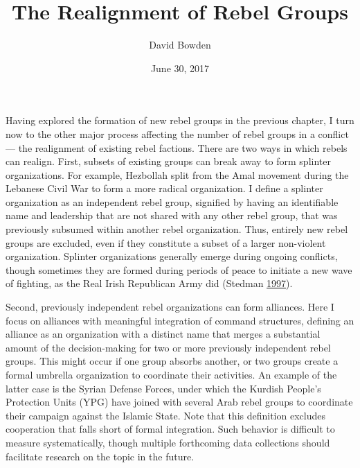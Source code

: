 \documentclass[12pt,]{book}
\title{The Realignment of Rebel Groups}
\author{David Bowden}
\date{June 30, 2017}
\theoremstyle{definition}
\theoremstyle{definition}
\theoremstyle{remark}
\begin{document}
\maketitle

\doublespacing

\mainmatter

Having explored the formation of new rebel groups in the previous
chapter, I turn now to the other major process affecting the number of
rebel groups in a conflict --- the realignment of existing rebel
factions. There are two ways in which rebels can realign. First, subsets
of existing groups can break away to form splinter organizations. For
example, Hezbollah split from the Amal movement during the Lebanese
Civil War to form a more radical organization. I define a splinter
organization as an independent rebel group, signified by having an
identifiable name and leadership that are not shared with any other
rebel group, that was previously subsumed within another rebel
organization. Thus, entirely new rebel groups are excluded, even if they
constitute a subset of a larger non-violent organization. Splinter
organizations generally emerge during ongoing conflicts, though
sometimes they are formed during periods of peace to initiate a new wave
of fighting, as the Real Irish Republican Army did (Stedman
\protect\hyperlink{ref-Stedman1997}{1997}).

Second, previously independent rebel organizations can form alliances.
Here I focus on alliances with meaningful integration of command
structures, defining an alliance as an organization with a distinct name
that merges a substantial amount of the decision-making for two or more
previously independent rebel groups. This might occur if one group
absorbs another, or two groups create a formal umbrella organization to
coordinate their activities. An example of the latter case is the Syrian
Defense Forces, under which the Kurdish People's Protection Units (YPG)
have joined with several Arab rebel groups to coordinate their campaign
against the Islamic State. Note that this definition excludes
cooperation that falls short of formal integration. Such behavior is
difficult to measure systematically, though multiple forthcoming data
collections should facilitate research on the topic in the future.
\end{document}

